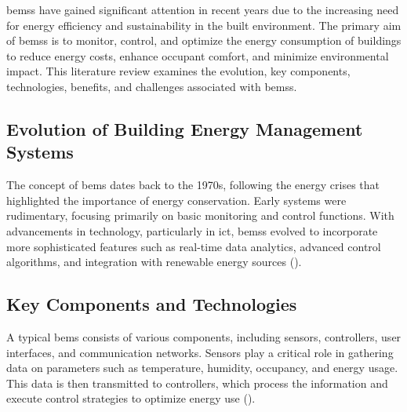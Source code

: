 \glspl{bems} have gained significant attention in recent years due to the increasing need for energy efficiency and sustainability in the built environment.
The primary aim of \glspl{bems} is to monitor, control, and optimize the energy consumption of buildings to reduce energy costs, enhance occupant comfort, and minimize environmental impact.
This literature review examines the evolution, key components, technologies, benefits, and challenges associated with \glspl{bems}.

\subsection*{Evolution of Building Energy Management Systems}
The concept of \gls{bems} dates back to the 1970s, following the energy crises that highlighted the importance of energy conservation.
Early systems were rudimentary, focusing primarily on basic monitoring and control functions.
With advancements in technology, particularly in \gls{ict}, \glspl{bems} evolved to incorporate more sophisticated features such as real-time data analytics, advanced control algorithms, and integration with renewable energy sources (\cite{Wang2012}).

\subsection*{Key Components and Technologies}
A typical \gls{bems} consists of various components, including sensors, controllers, user interfaces, and communication networks.
Sensors play a critical role in gathering data on parameters such as temperature, humidity, occupancy, and energy usage.
This data is then transmitted to controllers, which process the information and execute control strategies to optimize energy use (\cite{Candanedo2016}).

